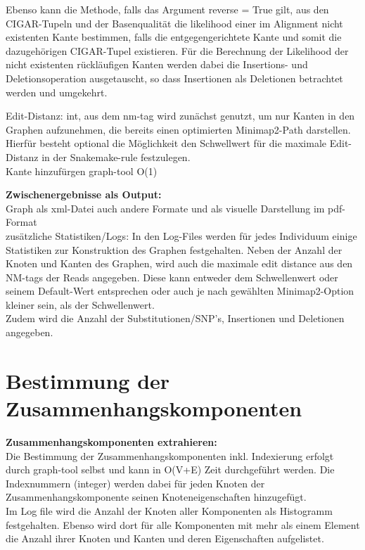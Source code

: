 Ebenso kann die Methode, falls das Argument reverse = True gilt, aus den CIGAR-Tupeln und der Basenqualität die likelihood einer im Alignment nicht existenten Kante bestimmen, falls die entgegengerichtete Kante und somit die dazugehörigen CIGAR-Tupel existieren. Für die Berechnung der Likelihood der nicht existenten rückläufigen Kanten werden dabei die Insertions- und Deletionsoperation ausgetauscht, so dass Insertionen als Deletionen betrachtet werden und umgekehrt.


Edit-Distanz: int, aus dem nm-tag wird zunächst genutzt, um nur Kanten in den Graphen aufzunehmen, die bereits einen optimierten Minimap2-Path darstellen. Hierfür besteht optional die Möglichkeit den Schwellwert für die maximale Edit-Distanz in der Snakemake-rule festzulegen.\\

Kante hinzufürgen graph-tool O(1)

    

\textbf{Zwischenergebnisse als Output:} \\
    Graph als xml-Datei auch andere Formate und als visuelle Darstellung im pdf-Format \\
    
zusätzliche Statistiken/Logs:
    In den Log-Files werden für jedes Individuum einige Statistiken zur Konstruktion des Graphen festgehalten. Neben der Anzahl der Knoten und Kanten des Graphen, wird auch die maximale edit distance aus den NM-tags der Reads angegeben. Diese kann entweder dem Schwellenwert oder seinem Default-Wert entsprechen oder auch je nach gewählten Minimap2-Option kleiner sein, als der Schwellenwert. \\
    Zudem wird die Anzahl der Substitutionen/SNP's, Insertionen und Deletionen angegeben.
    
\section{Bestimmung der Zusammenhangskomponenten} \label{sec:comp}
\textbf{Zusammenhangskomponenten extrahieren:} \\
    Die Bestimmung der Zusammenhangskomponenten inkl. Indexierung erfolgt durch graph-tool selbst und kann in O(V+E) Zeit durchgeführt werden. Die Indexnummern (integer) werden dabei für jeden Knoten der Zusammenhangskomponente seinen Knoteneigenschaften hinzugefügt.\\
     Im Log file wird die Anzahl der Knoten aller Komponenten als Histogramm festgehalten. Ebenso wird dort für alle Komponenten mit mehr als einem Element die Anzahl ihrer Knoten und Kanten und deren Eigenschaften aufgelistet.

